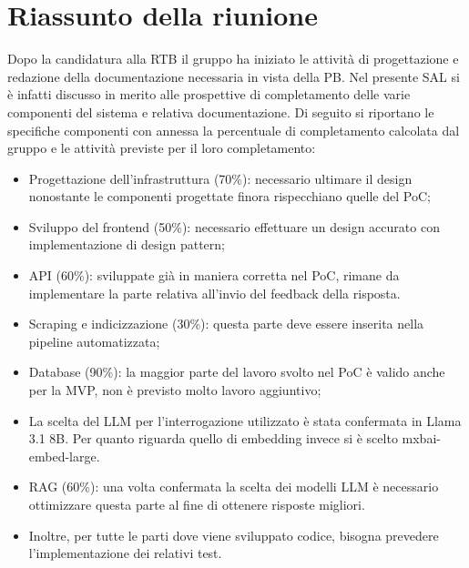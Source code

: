 \section{Riassunto della riunione}
Dopo la candidatura alla RTB il gruppo ha iniziato le attività di progettazione e redazione della documentazione necessaria in vista della PB. Nel presente SAL si è infatti discusso in merito alle prospettive di completamento delle varie componenti del sistema e relativa documentazione. Di seguito si riportano le specifiche componenti con annessa la percentuale di completamento calcolata dal gruppo e le attività previste per il loro completamento:
\begin{itemize}
    \item Progettazione dell'infrastruttura (70\%): necessario ultimare il design nonostante le componenti progettate finora rispecchiano quelle del PoC;
    \item Sviluppo del frontend (50\%): necessario effettuare un design accurato con implementazione di design pattern;
    \item API (60\%): sviluppate già in maniera corretta nel PoC, rimane da implementare la parte relativa all'invio del feedback della risposta.
    \item Scraping e indicizzazione (30\%): questa parte deve essere inserita nella pipeline automatizzata;
    \item Database (90\%): la maggior parte del lavoro svolto nel PoC è valido anche per la MVP, non è previsto molto lavoro aggiuntivo;
    \item La scelta del LLM per l'interrogazione utilizzato è stata confermata in Llama 3.1 8B. Per quanto riguarda quello di embedding invece si è scelto mxbai-embed-large.
    \item RAG (60\%): una volta confermata la scelta dei modelli LLM è necessario ottimizzare questa parte al fine di ottenere risposte migliori.
    \item Inoltre, per tutte le parti dove viene sviluppato codice, bisogna prevedere l'implementazione dei relativi test.
\end{itemize}